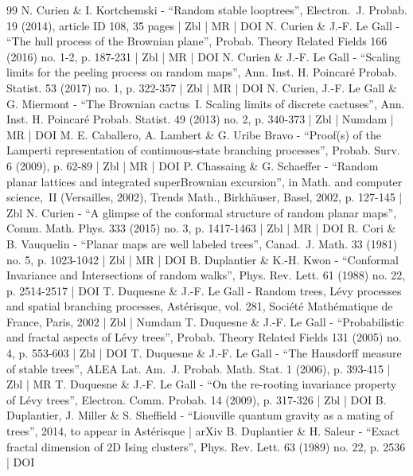 \documentclass[10pt]{amsart}
\theoremstyle{plain}
\numberwithin{theorem}{section}
\theoremstyle{definition}
\begin{document}
\begin{thebibliography}{99}
N. Curien \& I. Kortchemski - “Random stable looptrees”, Electron. J. Probab. 19 (2014), article ID 108, 35 pages | Zbl | MR | DOI
N. Curien \& J.-F. Le Gall - “The hull process of the Brownian plane”, Probab. Theory Related Fields 166 (2016) no. 1-2, p. 187-231 | Zbl | MR | DOI
N. Curien \& J.-F. Le Gall - “Scaling limits for the peeling process on random maps”, Ann. Inst. H. Poincaré Probab. Statist. 53 (2017) no. 1, p. 322-357 | Zbl | MR | DOI
N. Curien, J.-F. Le Gall \& G. Miermont - “The Brownian cactus I. Scaling limits of discrete cactuses”, Ann. Inst. H. Poincaré Probab. Statist. 49 (2013) no. 2, p. 340-373 | Zbl | Numdam | MR | DOI
M. E. Caballero, A. Lambert \& G. Uribe Bravo - “Proof(s) of the Lamperti representation of continuous-state branching processes”, Probab. Surv. 6 (2009), p. 62-89 | Zbl | MR | DOI
P. Chassaing \& G. Schaeffer - “Random planar lattices and integrated superBrownian excursion”, in Math. and computer science, II (Versailles, 2002), Trends Math., Birkhäuser, Basel, 2002, p. 127-145 | Zbl
N. Curien - “A glimpse of the conformal structure of random planar maps”, Comm. Math. Phys. 333 (2015) no. 3, p. 1417-1463 | Zbl | MR | DOI
R. Cori \& B. Vauquelin - “Planar maps are well labeled trees”, Canad. J. Math. 33 (1981) no. 5, p. 1023-1042 | Zbl | MR | DOI
B. Duplantier \& K.-H. Kwon - “Conformal Invariance and Intersections of random walks”, Phys. Rev. Lett. 61 (1988) no. 22, p. 2514-2517 | DOI
T. Duquesne \& J.-F. Le Gall - Random trees, Lévy processes and spatial branching processes, Astérisque, vol. 281, Société Mathématique de France, Paris, 2002 | Zbl | Numdam
T. Duquesne \& J.-F. Le Gall - “Probabilistic and fractal aspects of Lévy trees”, Probab. Theory Related Fields 131 (2005) no. 4, p. 553-603 | Zbl | DOI
T. Duquesne \& J.-F. Le Gall - “The Hausdorff measure of stable trees”, ALEA Lat. Am. J. Probab. Math. Stat. 1 (2006), p. 393-415 | Zbl | MR
T. Duquesne \& J.-F. Le Gall - “On the re-rooting invariance property of Lévy trees”, Electron. Comm. Probab. 14 (2009), p. 317-326 | Zbl | DOI
B. Duplantier, J. Miller \& S. Sheffield - “Liouville quantum gravity as a mating of trees”, 2014, to appear in Astérisque | arXiv
B. Duplantier \& H. Saleur - “Exact fractal dimension of 2D Ising clusters”, Phys. Rev. Lett. 63 (1989) no. 22, p. 2536 | DOI

\end{thebibliography}
\end{document}

